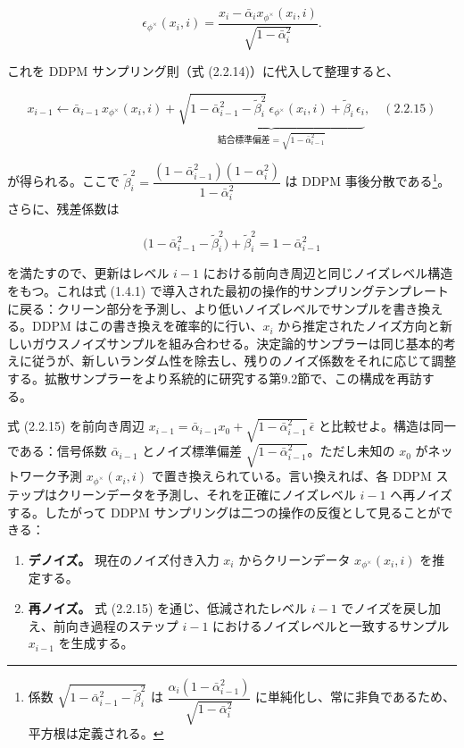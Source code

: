 \[
\epsilon_{\phi^\times}(x_i,i) = \frac{x_i - \bar{\alpha}_i x_{\phi^\times}(x_i,i)}{\sqrt{1-\bar{\alpha}_i^2}}.
\]


これを DDPM サンプリング則（式 (2.2.14)）に代入して整理すると、

\[
x_{i-1} \leftarrow \bar{\alpha}_{i-1}\, x_{\phi^\times}(x_i,i) + \underbrace{\sqrt{1-\bar{\alpha}_{i-1}^2-\tilde{\beta}_i^2}\,\epsilon_{\phi^\times}(x_i,i) + \tilde{\beta}_i\,\epsilon_i}_{\text{結合標準偏差}=\sqrt{1-\bar{\alpha}_{i-1}^2}}, \quad (2.2.15)
\]


が得られる。ここで $\tilde{\beta}_i^2 = \dfrac{(1-\bar{\alpha}_{i-1}^2)(1-\alpha_i^2)}{1-\bar{\alpha}_i^2}$ は DDPM 事後分散である\footnote{係数 $\sqrt{1-\bar{\alpha}_{i-1}^2-\tilde{\beta}_i^2}$ は $\dfrac{\alpha_i(1-\bar{\alpha}_{i-1}^2)}{\sqrt{1-\bar{\alpha}_i^2}}$ に単純化し、常に非負であるため、平方根は定義される。}。さらに、残差係数は

\[
\bigl(1-\bar{\alpha}_{i-1}^2-\tilde{\beta}_i^2\bigr) + \tilde{\beta}_i^2 = 1-\bar{\alpha}_{i-1}^2
\]


を満たすので、更新はレベル $i-1$ における前向き周辺と同じノイズレベル構造をもつ。これは式 (1.4.1) で導入された最初の操作的サンプリングテンプレートに戻る：クリーン部分を予測し、より低いノイズレベルでサンプルを書き換える。DDPM はこの書き換えを確率的に行い、$x_i$ から推定されたノイズ方向と新しいガウスノイズサンプルを組み合わせる。決定論的サンプラーは同じ基本的考えに従うが、新しいランダム性を除去し、残りのノイズ係数をそれに応じて調整する。拡散サンプラーをより系統的に研究する第9.2節で、この構成を再訪する。

式 (2.2.15) を前向き周辺 $x_{i-1}=\bar{\alpha}_{i-1}x_0+\sqrt{1-\bar{\alpha}_{i-1}^2}\,\bar{\epsilon}$ と比較せよ。構造は同一である：信号係数 $\bar{\alpha}_{i-1}$ とノイズ標準偏差 $\sqrt{1-\bar{\alpha}_{i-1}^2}$。ただし未知の $x_0$ がネットワーク予測 $x_{\phi^\times}(x_i,i)$ で置き換えられている。言い換えれば、各 DDPM ステップはクリーンデータを予測し、それを正確にノイズレベル $i-1$ へ再ノイズする。したがって DDPM サンプリングは二つの操作の反復として見ることができる：

\begin{enumerate}
\item \textbf{デノイズ。} 現在のノイズ付き入力 $x_i$ からクリーンデータ $x_{\phi^\times}(x_i,i)$ を推定する。
\item \textbf{再ノイズ。} 式 (2.2.15) を通じ、低減されたレベル $i-1$ でノイズを戻し加え、前向き過程のステップ $i-1$ におけるノイズレベルと一致するサンプル $x_{i-1}$ を生成する。
\end{enumerate}



